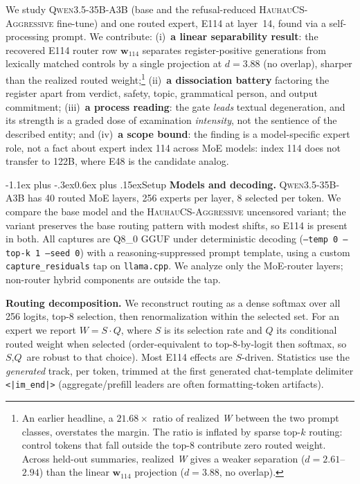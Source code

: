 \documentclass[10pt]{article}
\makeatletter
\renewcommand\section{\@startsection{section}{1}{\z@}%
  {-1.1ex plus -.3ex}{0.6ex plus .15ex}{\normalfont\large\bfseries}}
\newcommand{\W}{\textit{W}}
\newcommand{\Sel}{\textit{S}}
\newcommand{\Q}{\textit{Q}}
\newcommand{\wvec}{\mathbf{w}_{114}}
\makeatother
\begin{document}
We study \textsc{Qwen3.5-35B-A3B} (base and the refusal-reduced
\textsc{HauhauCS-Aggressive} fine-tune) and one routed expert, E114 at
layer~14, found via a self-processing prompt. We contribute:
(i)~\textbf{a linear separability result}: the recovered E114 router row $\wvec$
separates register-positive generations from lexically matched controls by a
single projection at $d{=}3.88$ (no overlap), sharper than the realized routed
weight;\footnote{An earlier headline, a $21.68\times$ ratio of realized \W{}
between the two prompt classes, overstates the margin. The ratio is inflated by
sparse top-$k$ routing: control tokens that fall outside the top-8 contribute
zero routed weight. Across held-out summaries, realized \W{} gives a weaker
separation ($d{=}2.61$--$2.94$) than the linear $\wvec$ projection
($d{=}3.88$, no overlap).}
(ii)~\textbf{a dissociation battery} factoring the register apart from verdict,
safety, topic, grammatical person, and output commitment;
(iii)~\textbf{a process reading}: the gate \emph{leads} textual degeneration, and
its strength is a graded dose of examination \emph{intensity}, not the sentience
of the described entity; and (iv)~\textbf{a scope bound}: the finding is a model-specific
expert role, not a fact about expert index 114 across MoE models: index 114 does
not transfer to 122B, where E48 is the candidate analog.

\vspace{-0.4em}
\section{Setup}
\vspace{-0.2em}
\textbf{Models and decoding.} \textsc{Qwen3.5-35B-A3B} has 40 routed MoE layers,
256 experts per layer, 8 selected per token. We compare the base model and the
\textsc{HauhauCS-Aggressive} uncensored variant; the variant preserves the base
routing pattern with modest shifts, so E114 is present in both. All captures are
Q8\_0 GGUF under deterministic decoding (\texttt{--temp 0 --top-k 1 --seed 0})
with a reasoning-suppressed prompt template, using a custom
\texttt{capture\_residuals} tap on \texttt{llama.cpp}. We analyze only the
MoE-router layers; non-router hybrid components are outside the tap.

\textbf{Routing decomposition.} We reconstruct routing as a dense softmax over all
256 logits, top-8 selection, then renormalization within the selected set. For an
expert we report $\W=\Sel\cdot\Q$, where $\Sel$ is its selection rate and $\Q$ its
conditional routed weight when selected (order-equivalent to top-8-by-logit then
softmax, so $\Sel,\Q$ are robust to that choice). Most E114 effects are
$\Sel$-driven. Statistics use the \emph{generated} track, per token, trimmed at
the first generated chat-template delimiter \texttt{<|im\_end|>}
(aggregate/prefill leaders are often formatting-token artifacts).
\end{document}
